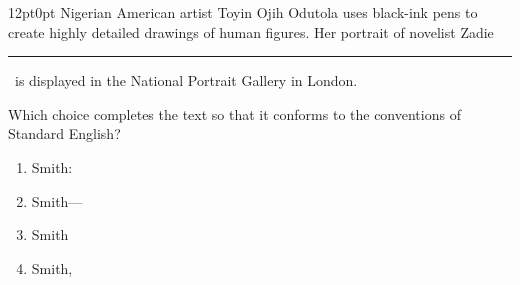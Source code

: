 \documentclass[11pt, twocolumn]{article}
\newcounter{questionnum}
\begin{document}
\vspace{6pt}\noindent
\begin{minipage}{\columnwidth}\raggedright
\noindent{}\par\vspace{8pt}
\begin{adjustwidth}{12pt}{0pt}
Nigerian American artist Toyin Ojih Odutola uses black-ink pens to create highly detailed drawings of human figures. Her portrait of novelist Zadie \,\rule{2cm}{0.4pt}\, is displayed in the National Portrait Gallery in London.
\vspace{6pt}

Which choice completes the text so that it conforms to the conventions of Standard English?
\begin{enumerate}[label=\Alph*),leftmargin=18pt,topsep=3pt,itemsep=2pt]
  \item Smith:
  \item Smith---
  \item Smith
  \item Smith,
\end{enumerate}
\end{adjustwidth}
\end{minipage}\par
\end{document}

